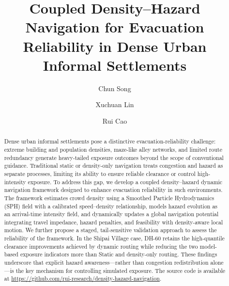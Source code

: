 \documentclass[preprint,12pt]{elsarticle}
\newif\ifanonymous
\begin{document}
\begin{frontmatter}

\title{Coupled Density--Hazard Navigation for Evacuation Reliability in Dense Urban Informal Settlements}

\ifanonymous
\else
\author[aff1]{Chun Song}
\author[aff2,aff3]{Xuchuan Lin}
\author[aff1]{Rui Cao}




\fi

\begin{abstract}
Dense urban informal settlements pose a distinctive evacuation-reliability challenge: extreme building and population densities, maze-like alley networks, and limited route redundancy generate heavy-tailed exposure outcomes beyond the scope of conventional guidance. Traditional static or density-only navigation treats congestion and hazard as separate processes, limiting its ability to ensure reliable clearance or control high-intensity exposure. To address this gap, we develop a coupled density–hazard dynamic navigation framework designed to enhance evacuation reliability in such environments. The framework estimates crowd density using a Smoothed Particle Hydrodynamics (SPH) field with a calibrated speed–density relationship, models hazard evolution as an arrival-time intensity field, and dynamically updates a global navigation potential integrating travel impedance, hazard penalties, and feasibility with density-aware local motion. We further propose a staged, tail-sensitive validation approach to assess the reliability of the framework. In the Shipai Village case, DH-60 retains the high-quantile clearance improvements achieved by dynamic routing while reducing the two model-based exposure indicators more than Static and density-only routing. These findings underscore that explicit hazard awareness—rather than congestion redistribution alone—is the key mechanism for controlling simulated exposure. The source code is available at \url{https://github.com/rui-research/density-hazard-navigation}.
\end{abstract}



\end{frontmatter}
\end{document}
